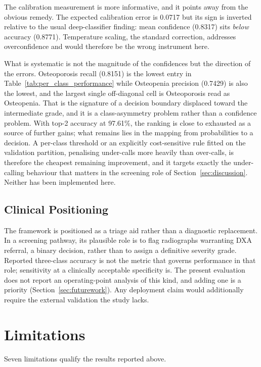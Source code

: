 \documentclass[journal]{IEEEtran}
\begin{document}
The calibration measurement is more informative, and it points away from the
obvious remedy. The expected calibration error is 0.0717 but its sign is
inverted relative to the usual deep-classifier finding: mean confidence (0.8317)
sits \emph{below} accuracy (0.8771). Temperature scaling, the standard
correction, addresses overconfidence and would therefore be the wrong
instrument here.

What is systematic is not the magnitude of the confidences but the direction of
the errors. Osteoporosis recall (0.8151) is the lowest entry in
Table~\ref{tab:per_class_performance} while Osteopenia precision (0.7429) is
also the lowest, and the largest single off-diagonal cell is Osteoporosis read
as Osteopenia. That is the signature of a decision boundary displaced toward the
intermediate grade, and it is a class-asymmetry problem rather than a confidence
problem. With top-2 accuracy at 97.61\%, the ranking is close to exhausted as a
source of further gains; what remains lies in the mapping from probabilities to
a decision. A per-class threshold or an explicitly cost-sensitive rule fitted on
the validation partition, penalising under-calls more heavily than over-calls,
is therefore the cheapest remaining improvement, and it targets exactly the
under-calling behaviour that matters in the screening role of
Section~\ref{sec:discussion}. Neither has been implemented here.

\subsection{Clinical Positioning}
The framework is positioned as a triage aid rather than a diagnostic
replacement. In a screening pathway, its plausible role is to flag radiographs
warranting DXA referral, a binary decision, rather than to assign a definitive
severity grade. Reported three-class accuracy is not the metric that governs
performance in that role; sensitivity at a clinically acceptable specificity is.
The present evaluation does not report an operating-point analysis of this kind,
and adding one is a priority (Section~\ref{sec:futurework}). Any deployment
claim would additionally require the external validation the study lacks.

\section{Limitations}
\label{sec:limitations}
Seven limitations qualify the results reported above.
\end{document}
